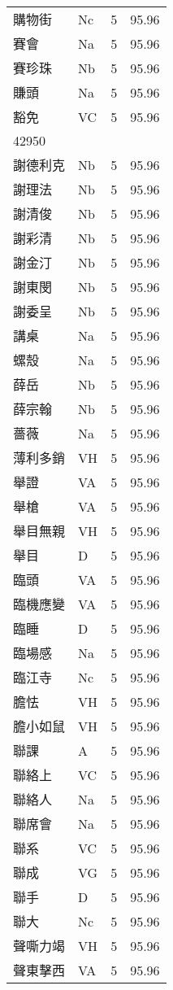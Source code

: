 \documentclass[twocolumn]{book}
\begin{document}
\begin{supertabular}{llrr}
購物街 & Nc & 5 &  95.96\\
賽會 & Na & 5 &  95.96\\
賽珍珠 & Nb & 5 &  95.96\\
賺頭 & Na & 5 &  95.96\\
豁免 & VC & 5 &  95.96\\
42950\\
謝德利克 & Nb & 5 &  95.96\\
謝理法 & Nb & 5 &  95.96\\
謝清俊 & Nb & 5 &  95.96\\
謝彩清 & Nb & 5 &  95.96\\
謝金汀 & Nb & 5 &  95.96\\
謝東閔 & Nb & 5 &  95.96\\
謝委呈 & Nb & 5 &  95.96\\
講桌 & Na & 5 &  95.96\\
螺殼 & Na & 5 &  95.96\\
薛岳 & Nb & 5 &  95.96\\
薛宗翰 & Nb & 5 &  95.96\\
薔薇 & Na & 5 &  95.96\\
薄利多銷 & VH & 5 &  95.96\\
舉證 & VA & 5 &  95.96\\
舉槍 & VA & 5 &  95.96\\
舉目無親 & VH & 5 &  95.96\\
舉目 & D & 5 &  95.96\\
臨頭 & VA & 5 &  95.96\\
臨機應變 & VA & 5 &  95.96\\
臨睡 & D & 5 &  95.96\\
臨場感 & Na & 5 &  95.96\\
臨江寺 & Nc & 5 &  95.96\\
膽怯 & VH & 5 &  95.96\\
膽小如鼠 & VH & 5 &  95.96\\
聯課 & A & 5 &  95.96\\
聯絡上 & VC & 5 &  95.96\\
聯絡人 & Na & 5 &  95.96\\
聯席會 & Na & 5 &  95.96\\
聯系 & VC & 5 &  95.96\\
聯成 & VG & 5 &  95.96\\
聯手 & D & 5 &  95.96\\
聯大 & Nc & 5 &  95.96\\
聲嘶力竭 & VH & 5 &  95.96\\
聲東擊西 & VA & 5 &  95.96\\

\end{supertabular}
\end{document}
